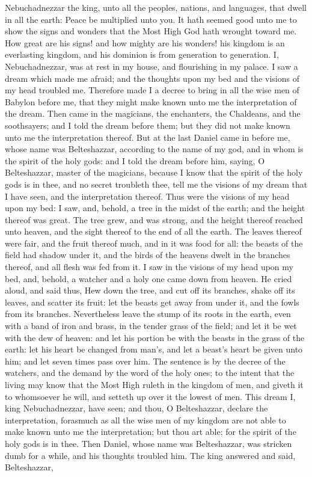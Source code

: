 Nebuchadnezzar the king, unto all the peoples, nations, and languages, that dwell in all the earth: Peace be multiplied unto you. It hath seemed good unto me to show the signs and wonders that the Most High God hath wrought toward me. How great are his signs! and how mighty are his wonders! his kingdom is an everlasting kingdom, and his dominion is from generation to generation.  I, Nebuchadnezzar, was at rest in my house, and flourishing in my palace. I saw a dream which made me afraid; and the thoughts upon my bed and the visions of my head troubled me. Therefore made I a decree to bring in all the wise men of Babylon before me, that they might make known unto me the interpretation of the dream. Then came in the magicians, the enchanters, the Chaldeans, and the soothsayers; and I told the dream before them; but they did not make known unto me the interpretation thereof. But at the last Daniel came in before me, whose name was Belteshazzar, according to the name of my god, and in whom is the spirit of the holy gods: and I told the dream before him, saying, O Belteshazzar, master of the magicians, because I know that the spirit of the holy gods is in thee, and no secret troubleth thee, tell me the visions of my dream that I have seen, and the interpretation thereof. Thus were the visions of my head upon my bed: I saw, and, behold, a tree in the midst of the earth; and the height thereof was great. The tree grew, and was strong, and the height thereof reached unto heaven, and the sight thereof to the end of all the earth. The leaves thereof were fair, and the fruit thereof much, and in it was food for all: the beasts of the field had shadow under it, and the birds of the heavens dwelt in the branches thereof, and all flesh was fed from it. I saw in the visions of my head upon my bed, and, behold, a watcher and a holy one came down from heaven. He cried aloud, and said thus, Hew down the tree, and cut off its branches, shake off its leaves, and scatter its fruit: let the beasts get away from under it, and the fowls from its branches. Nevertheless leave the stump of its roots in the earth, even with a band of iron and brass, in the tender grass of the field; and let it be wet with the dew of heaven: and let his portion be with the beasts in the grass of the earth: let his heart be changed from man’s, and let a beast’s heart be given unto him; and let seven times pass over him. The sentence is by the decree of the watchers, and the demand by the word of the holy ones; to the intent that the living may know that the Most High ruleth in the kingdom of men, and giveth it to whomsoever he will, and setteth up over it the lowest of men. This dream I, king Nebuchadnezzar, have seen; and thou, O Belteshazzar, declare the interpretation, forasmuch as all the wise men of my kingdom are not able to make known unto me the interpretation; but thou art able; for the spirit of the holy gods is in thee.  Then Daniel, whose name was Belteshazzar, was stricken dumb for a while, and his thoughts troubled him. The king answered and said, Belteshazzar, 